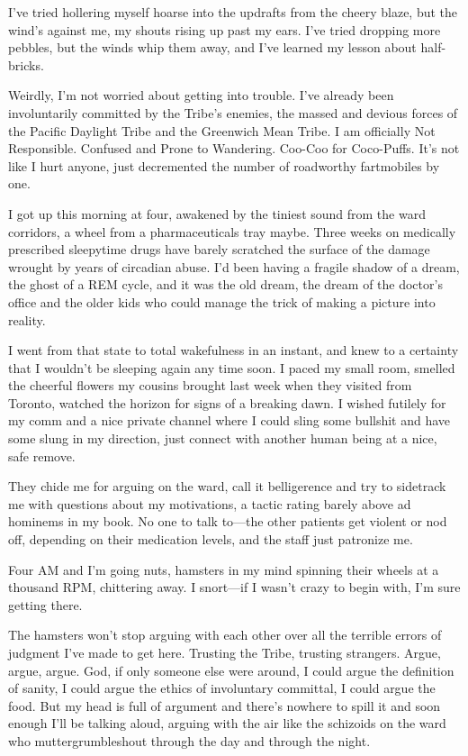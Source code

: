 I’ve tried hollering myself hoarse into the updrafts from the
cheery blaze, but the wind’s against me, my shouts rising up past
my ears. I’ve tried dropping more pebbles, but the winds whip them
away, and I’ve learned my lesson about half-bricks.

Weirdly, I’m not worried about getting into trouble. I’ve already
been involuntarily committed by the Tribe’s enemies, the massed and
devious forces of the Pacific Daylight Tribe and the Greenwich Mean
Tribe. I am officially Not Responsible. Confused and Prone to
Wandering. Coo-Coo for Coco-Puffs. It’s not like I hurt anyone,
just decremented the number of roadworthy fartmobiles by one.

I got up this morning at four, awakened by the tiniest sound from
the ward corridors, a wheel from a pharmaceuticals tray maybe.
Three weeks on medically prescribed sleepytime drugs have barely
scratched the surface of the damage wrought by years of circadian
abuse. I’d been having a fragile shadow of a dream, the ghost of a
REM cycle, and it was the old dream, the dream of the doctor’s
office and the older kids who could manage the trick of making a
picture into reality.

I went from that state to total wakefulness in an instant, and knew
to a certainty that I wouldn’t be sleeping again any time soon. I
paced my small room, smelled the cheerful flowers my cousins
brought last week when they visited from Toronto, watched the
horizon for signs of a breaking dawn. I wished futilely for my comm
and a nice private channel where I could sling some bullshit and
have some slung in my direction, just connect with another human
being at a nice, safe remove.

They chide me for arguing on the ward, call it belligerence and try
to sidetrack me with questions about my motivations, a tactic
rating barely above ad hominems in my book. No one to talk to—the
other patients get violent or nod off, depending on their
medication levels, and the staff just patronize me.

Four AM and I’m going nuts, hamsters in my mind spinning their
wheels at a thousand RPM, chittering away. I snort—if I wasn’t
crazy to begin with, I’m sure getting there.

The hamsters won’t stop arguing with each other over all the
terrible errors of judgment I’ve made to get here. Trusting the
Tribe, trusting strangers. Argue, argue, argue. God, if only
someone else were around, I could argue the definition of sanity, I
could argue the ethics of involuntary committal, I could argue the
food. But my head is full of argument and there’s nowhere to spill
it and soon enough I’ll be talking aloud, arguing with the air like
the schizoids on the ward who muttergrumbleshout through the day
and through the night.

